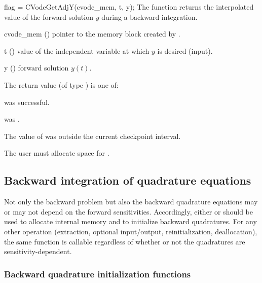 {
  flag = CVodeGetAdjY(cvode\_mem, t, y);
}
{
  The function  returns the interpolated value of
  the forward solution $y$ during a backward integration.
}
{
  \begin{args}
  \item[cvode\_mem] ()
    pointer to the {\cvodes} memory block created by .
  \item[t] ()
    value of the independent variable at which $y$ is desired (input).
  \item[y] () forward solution $y(t)$.
  \end{args}
}
{
  The return value  (of type ) is one of:
 \begin{args}
  \item[\Id{CV\_SUCCESS}] 
     was successful. 
  \item[\Id{CV\_MEM\_NULL}]
     was .
  \item[\Id{CV\_GETY\_BADT}]
    The value of  was outside the current checkpoint interval.
  \end{args}
}
{
  {\warn} The user must allocate space for .
}

\subsection{Backward integration of quadrature equations}

Not only the backward problem but also the backward quadrature equations 
may or may not depend on the forward sensitivities.  Accordingly, either 
 or  should be used to allocate internal 
memory and to initialize backward quadratures.  For any other operation 
(extraction, optional input/output, reinitialization, deallocation),
the same function is callable regardless of whether or not the quadratures
are sensitivity-dependent.

\subsubsection{Backward quadrature initialization functions}
\label{sss:cvquadinitb}

